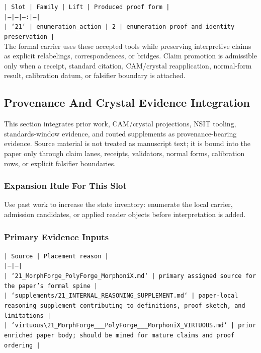 \documentclass[11pt]{article}
\begin{document}
\noindent\texttt{| Slot | Family | Lift | Produced proof form |}\\
\noindent\texttt{|---|---|---:|---|}\\
\noindent\texttt{| `21` | enumeration\_action | 2 | enumeration proof and identity preservation |}\\

The formal carrier uses these accepted tools while preserving interpretive
claims as explicit relabelings, correspondences, or bridges. Claim promotion is admissible only when a receipt, standard citation,
CAM/crystal reapplication, normal-form result, calibration datum, or falsifier
boundary is attached.

\subsection*{Provenance And Crystal Evidence Integration}

This section integrates prior work, CAM/crystal projections, NSIT tooling,
standards-window evidence, and routed supplements as provenance-bearing
evidence. Source material is not treated as manuscript text; it is bound into
the paper only through claim lanes, receipts, validators, normal forms,
calibration rows, or explicit falsifier boundaries.

\subsubsection*{Expansion Rule For This Slot}

Use past work to increase the state inventory: enumerate the local carrier, admission candidates, or applied reader objects before interpretation is added.

\subsubsection*{Primary Evidence Inputs}

\noindent\texttt{| Source | Placement reason |}\\
\noindent\texttt{|---|---|}\\
\noindent\texttt{| `21\_MorphForge\_PolyForge\_MorphoniX.md` | primary assigned source for the paper's formal spine |}\\
\noindent\texttt{| `supplements/21\_INTERNAL\_REASONING\_SUPPLEMENT.md` | paper-local reasoning supplement contributing to definitions, proof sketch, and limitations |}\\
\noindent\texttt{| `virtuous\textbackslash{}21\_MorphForge\_\_\_PolyForge\_\_\_MorphoniX\_VIRTUOUS.md` | prior enriched paper body; should be mined for mature claims and proof ordering |}\\
\end{document}
